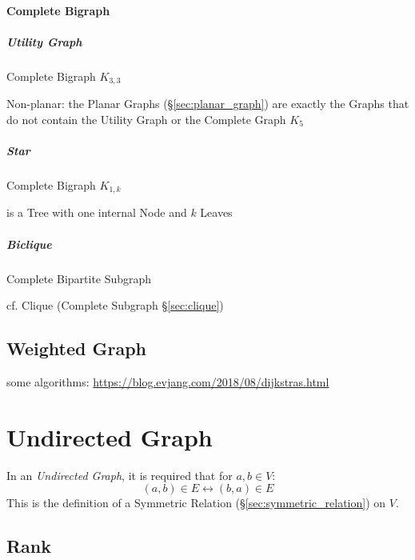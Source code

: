 \paragraph{Complete Bigraph}\label{sec:complete_bigraph}\hfill

\subparagraph{Utility Graph}\label{sec:utility_graph}\hfill

Complete Bigraph $K_{3,3}$

Non-planar: the Planar Graphs (\S\ref{sec:planar_graph}) are exactly the Graphs
that do not contain the Utility Graph or the Complete Graph $K_5$



\subparagraph{Star}\label{sec:star}\hfill

Complete Bigraph $K_{1,k}$

is a Tree with one internal Node and $k$ Leaves



\subparagraph{Biclique}\label{sec:biclique}\hfill

Complete Bipartite Subgraph

cf. Clique (Complete Subgraph \S\ref{sec:clique})



\subsection{Weighted Graph}\label{sec:weighted_graph}

some algorithms: \url{https://blog.evjang.com/2018/08/dijkstras.html}



\section{Undirected Graph}\label{sec:undirected_graph}

In an \emph{Undirected Graph}, it is required that for $a,b \in V$:
\[
    (a,b) \in E \leftrightarrow (b,a) \in E
\]
This is the definition of a Symmetric Relation
(\S\ref{sec:symmetric_relation}) on $V$.



\subsection{Rank}\label{sec:rank}

